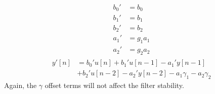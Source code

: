 \documentclass{IEEEtran}
\begin{document}
%
\begin{align}
    \begin{split}
        b_0' &= b_0\\
        b_1' &= b_1\\
        b_2' &= b_2\\
        a_1' &= g_1 a_1\\
        a_2' &= g_2 a_2
    \end{split}
        \label{eq:bq2_coefs_re-write}
\end{align}
%
\begin{equation}
    \begin{split}
        y'[n] &= b_0' u[n]
        + b_1' u[n-1] - a_1' y[n-1] \\
        & + b_2' u[n-2] - a_2' y[n-2]
        - a_1\gamma_1 - a_2\gamma_2
    \end{split}
        \label{eq:nlbq2_re-write2}
\end{equation}
%
Again, the $\gamma$ offset terms will not affect the filter stability.
\end{document}
